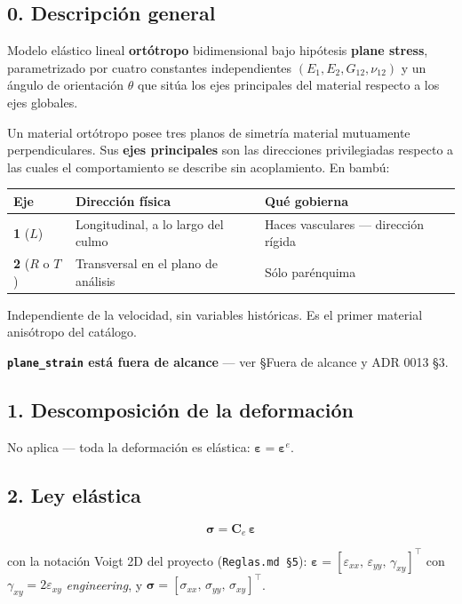 \documentclass[11pt,letterpaper,oneside]{report}
\begin{document}
\subsection{0. Descripción general}

Modelo elástico lineal \textbf{ortótropo} bidimensional bajo hipótesis \textbf{plane stress}, parametrizado por cuatro constantes independientes $(E_1, E_2, G_{12}, \nu_{12})$ y un ángulo de orientación $\theta$ que sitúa los ejes principales del material respecto a los ejes globales.

Un material ortótropo posee tres planos de simetría material mutuamente perpendiculares. Sus \textbf{ejes principales} son las direcciones privilegiadas respecto a las cuales el comportamiento se describe sin acoplamiento. En bambú:

\begin{center}
\begin{tabularx}{\textwidth}{YYY}
\hline
\textbf{Eje} & \textbf{Dirección física} & \textbf{Qué gobierna} \\
\hline
\textbf{1} ($L$) & Longitudinal, a lo largo del culmo & Haces vasculares --- dirección rígida \\
\textbf{2} ($R$ o $T$) & Transversal en el plano de análisis & Sólo parénquima \\
\hline
\end{tabularx}
\end{center}
Independiente de la velocidad, sin variables históricas. Es el primer material anisótropo del catálogo.

\textbf{\texttt{plane\_strain} está fuera de alcance} --- ver §Fuera de alcance y ADR 0013 §3.

\subsection{1. Descomposición de la deformación}

No aplica --- toda la deformación es elástica: $\boldsymbol\varepsilon = \boldsymbol\varepsilon^e$.

\subsection{2. Ley elástica}

\[
\boldsymbol\sigma = \mathbf C_e\,\boldsymbol\varepsilon
\]

con la notación Voigt 2D del proyecto (\texttt{Reglas.md §5}): $\boldsymbol\varepsilon = [\varepsilon_{xx},\,\varepsilon_{yy},\,\gamma_{xy}]^\top$ con $\gamma_{xy} = 2\varepsilon_{xy}$ \textit{engineering}, y $\boldsymbol\sigma = [\sigma_{xx},\,\sigma_{yy},\,\sigma_{xy}]^\top$.
\end{document}
